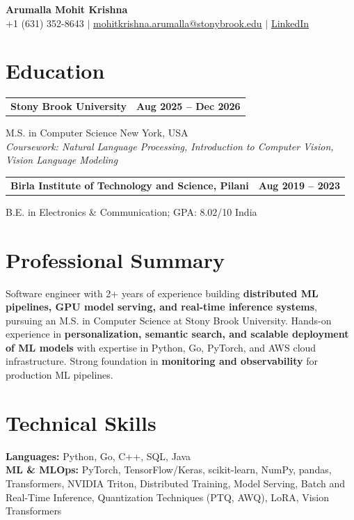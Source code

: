 \documentclass[letterpaper,10pt]{article}
\makeatletter
\newcommand{\entry}[2]{%
  \noindent
  \begin{tabularx}{\linewidth}
    {@{}>{\raggedright\arraybackslash}X@{\hspace{6pt}}r@{}}
    \textbf{#1} & #2
  \end{tabularx}\par
}
\makeatother
\begin{document}
\begin{center}
    {\LARGE\bfseries Arumalla Mohit Krishna}\\[3pt]
    +1 (631) 352-8643 $|$
    \href{mailto:mohitkrishna.arumalla@stonybrook.edu}
    {mohitkrishna.arumalla@stonybrook.edu} $|$
    \href{https://linkedin.com/in/mohit-krishna-arumalla}
    {LinkedIn}
\end{center}
\vspace{-8pt}

\section{Education}

\entry
  {Stony Brook University}
  {\textbf{Aug 2025 -- Dec 2026}}

M.S. in Computer Science \hfill New York, USA\\
\textit{
Coursework: Natural Language Processing,
Introduction to Computer Vision, Vision Language Modeling
}
\vspace{3pt}

\entry
  {Birla Institute of Technology and Science, Pilani}
  {\textbf{Aug 2019 -- 2023}}

B.E. in Electronics \& Communication; GPA: 8.02/10 \hfill India
\section{Professional Summary}

Software engineer with 2+ years of experience building \textbf{distributed ML pipelines, GPU model serving, and real-time inference systems}, pursuing an M.S. in Computer Science at Stony Brook University. Hands-on experience in \textbf{personalization, semantic search, and scalable deployment of ML models} with expertise in Python, Go, PyTorch, and AWS cloud infrastructure. Strong foundation in \textbf{monitoring and observability} for production ML pipelines.

\section{Technical Skills}

\textbf{Languages:}
Python, Go, C++, SQL, Java\\

\textbf{ML \& MLOps:}
PyTorch, TensorFlow/Keras, scikit-learn, NumPy, pandas,
Transformers, NVIDIA Triton, Distributed Training, Model Serving,
Batch and Real-Time Inference, Quantization Techniques (PTQ, AWQ), LoRA, Vision Transformers\\
\end{document}
